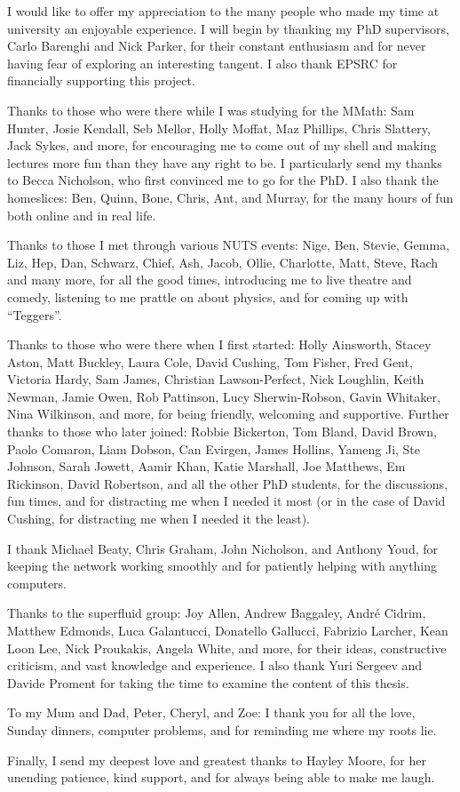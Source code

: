 \begin{acknowledgements}
 I would like to offer my appreciation to the many people who made my time at university an enjoyable experience. I will begin by thanking my PhD supervisors, Carlo Barenghi and Nick Parker, for their constant enthusiasm and for never having fear of exploring an interesting tangent. I also thank EPSRC for financially supporting this project.

 Thanks to those who were there while I was studying for the MMath: Sam Hunter, Josie Kendall, Seb Mellor, Holly Moffat, Maz Phillips, Chris Slattery, Jack Sykes, and more, for encouraging me to come out of my shell and making lectures more fun than they have any right to be. I particularly send my thanks to Becca Nicholson, who first convinced me to go for the PhD. I also thank the homeslices: Ben, Quinn, Bone, Chris, Ant, and Murray, for the many hours of fun both online and in real life.

 Thanks to those I met through various NUTS events: Nige, Ben, Stevie, Gemma, Liz, Hep, Dan, Schwarz, Chief, Ash, Jacob, Ollie, Charlotte, Matt, Steve, Rach and many more, for all the good times, introducing me to live theatre and comedy, listening to me prattle on about physics, and for coming up with ``Teggers''. 

 Thanks to those who were there when I first started: Holly Ainsworth, Stacey Aston, Matt Buckley, Laura Cole, David Cushing, Tom Fisher, Fred Gent, Victoria Hardy, Sam James, Christian Lawson-Perfect, Nick Loughlin, Keith Newman, Jamie Owen, Rob Pattinson, Lucy Sherwin-Robson, Gavin Whitaker, Nina Wilkinson, and more, for being friendly, welcoming and supportive. Further thanks to those who later joined: Robbie Bickerton, Tom Bland, David Brown, Paolo Comaron, Liam Dobson, Can Evirgen, James Hollins, Yameng Ji, Ste Johnson, Sarah Jowett, Aamir Khan, Katie Marshall, Joe Matthews, Em Rickinson, David Robertson, and all the other PhD students, for the discussions, fun times, and for distracting me when I needed it most (or in the case of David Cushing, for distracting me when I needed it the least).

 I thank Michael Beaty, Chris Graham, John Nicholson, and Anthony Youd, for keeping the network working smoothly and for patiently helping with anything computers.

 Thanks to the superfluid group: Joy Allen, Andrew Baggaley, Andr\'e Cidrim, Matthew Edmonds, Luca Galantucci, Donatello Gallucci, Fabrizio Larcher, Kean Loon Lee, Nick Proukakis, Angela White, and more, for their ideas, constructive criticism, and vast knowledge and experience. I also thank Yuri Sergeev and Davide Proment for taking the time to examine the content of this thesis.

 To my Mum and Dad, Peter, Cheryl, and Zoe: I thank you for all the love, Sunday dinners, computer problems, and for reminding me where my roots lie.

 Finally, I send my deepest love and greatest thanks to Hayley Moore, for her unending patience, kind support, and for always being able to make me laugh.


\end{acknowledgements}
\thispagestyle{empty}
\restoregeometry

